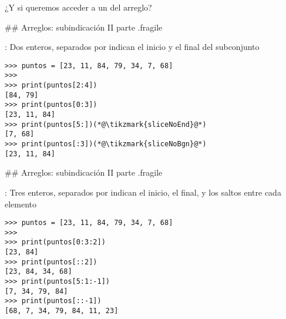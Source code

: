\bgnblockidea
\footnotesize
¿Y si queremos acceder a un  del arreglo?
\trmblockidea

\trmcolumns

## Arreglos: subindicación II parte {.fragile}


\vfill

\bgnblockdefinition
{}: Dos enteros, separados por \bld{:} indican el inicio y el
final del subconjunto
\trmblockdefinition

\begin{lstlisting}[style=frame03]
>>> puntos = [23, 11, 84, 79, 34, 7, 68]
>>>
>>> print(puntos[2:4])
[84, 79]
>>> print(puntos[0:3])
[23, 11, 84]
>>> print(puntos[5:])(*@\tikzmark{sliceNoEnd}@*)
[7, 68]
>>> print(puntos[:3])(*@\tikzmark{sliceNoBgn}@*)
[23, 11, 84]
\end{lstlisting}


## Arreglos: subindicación II parte {.fragile}


\vfill

\bgnblockdefinition
{}: \alert{Tres} enteros, separados por \bld{:} indican el inicio, el
final, y los saltos entre cada elemento
\trmblockdefinition

\bgncolumns
{}
\vspace{-2ex}

\begin{lstlisting}[style=frame03]
>>> puntos = [23, 11, 84, 79, 34, 7, 68]
>>>
>>> print(puntos[0:3:2])
[23, 84]
>>> print(puntos[::2])
[23, 84, 34, 68]
>>> print(puntos[5:1:-1])
[7, 34, 79, 84]
>>> print(puntos[::-1])
[68, 7, 34, 79, 84, 11, 23]
\end{lstlisting}

